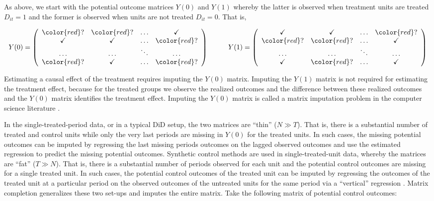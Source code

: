 As above, we start with the potential outcome matrices $Y(0)$ and $Y(1)$ whereby the latter is observed when treatment units are treated $D_{it} = 1$ and the former is observed when units are not treated $D_{it} = 0$. That is,

$$
Y(0)=\left(
\begin{array}{cccc}
{\color{red} ?}   &  {\color{red} ?}  & \ldots &   \checkmark  \\
\checkmark        &  \checkmark       & \ldots &   {\color{red} ?}  \\
 \ldots           &  \ldots           & \ddots &   \ldots \\
{\color{red} ?}   &  \checkmark       & \ldots &  {\color{red} ?}  \\
\end{array}
\right)\hskip1cm  Y(1)=\left(
\begin{array}{cccc}
\checkmark   &  \checkmark & \ldots & {\color{red} ?}     \\
{\color{red} ?}        &  {\color{red} ?}        & \ldots &   \checkmark  \\
 \ldots           &  \ldots           & \ddots &   \ldots \\
\checkmark  &  {\color{red} ?}        & \ldots &  \checkmark  \\
\end{array}
\right)
$$

Estimating a causal effect of the treatment requires imputing the $Y(0)$ matrix. Imputing the $Y(1)$ matrix is not required for estimating the treatment effect, because for the treated groups we observe the realized outcomes and the difference between these realized outcomes and the $Y(0)$ matrix identifies the treatment effect. Imputing the $Y(0)$ matrix is called a matrix imputation problem in the computer science literature \cite{Athey.2021}. 

In the single-treated-period data, or in a typical DiD setup, the two matrices are ``thin'' ($N \gg T$). That is, there is a substantial number of treated and control units while only the very last periods are missing in $Y(0)$ for the treated units. In such cases, the missing potential outcomes can be imputed by regressing the last missing periods outcomes on the lagged observed outcomes and use the estimated regression to predict the missing potential outcomes. Synthetic control methods are used in single-treated-unit data, whereby the matrices are ``fat''  ($T \gg N$). That is, there is a substantial number of periods observed for each unit and the potential control outcomes are missing for a single treated unit. In such cases, the potential control outcomes of the treated unit can be imputed by regressing the outcomes of the treated unit at a particular period on the observed outcomes of the untreated units for the same period via a ``vertical'' regression \cite{Abadie.2010}. Matrix completion generalizes these two set-ups and imputes the entire matrix. Take the following matrix of potential control outcomes:



